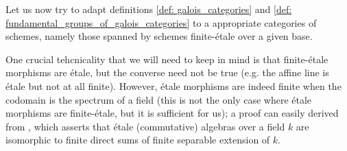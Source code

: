         Let us now try to adapt definitions \ref{def: galois_categories} and \ref{def: fundamental_groups_of_galois_categories} to a appropriate categories of schemes, namely those spanned by schemes finite-\'etale over a given base.
        \begin{remark} \label{remark: etale_vs_finite_etale}
            One crucial tehcnicality that we will need to keep in mind is that finite-\'etale morphisms are \'etale, but the converse need not be true (e.g. the affine line is \'etale but not at all finite). However, \'etale morphisms are indeed finite when the codomain is the spectrum of a field (this is not the only case where \'etale morphisms are finite-\'etale, but it is sufficient for us); a proof can easily derived from \cite[\href{https://stacks.math.columbia.edu/tag/00U3}{Tag 00U3}]{stacks}, which asserts that \'etale (commutative) algebras over a field $k$ are isomorphic to finite direct sums of finite separable extension of $k$. 
        \end{remark}
